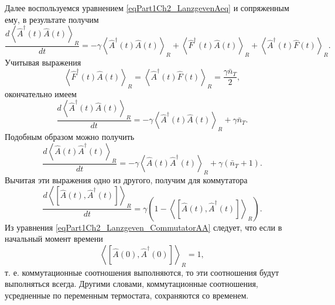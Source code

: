 Далее воспользуемся уравнением \eqref{eqPart1Ch2_LanzgevenAeq} и
сопряженным ему, в результате получим
\begin{equation}
\frac{d \left<\hat{A}^{\dag}\left(t\right)\hat{A}\left(t\right)\right>_R}{d
t}=
- \gamma \left<\hat{A}^{\dag}\left(t\right)\hat{A}\left(t\right)\right>_R
+ \left<\hat{F}^{\dag}\left(t\right)\hat{A}\left(t\right)\right>_R + 
\left<\hat{A}^{\dag}\left(t\right)\hat{F}\left(t\right)\right>_R.
\nonumber
\end{equation}
Учитывая выражения 
\begin{equation}
\left<\hat{F}^{\dag}\left(t\right)\hat{A}\left(t\right)\right>_R =
\left<\hat{A}^{\dag}\left(t\right)\hat{F}\left(t\right)\right>_R = 
\frac{\gamma \bar{n}_T}{2},
\nonumber
\end{equation}
окончательно имеем
\begin{equation}
\frac{d \left<\hat{A}^{\dag}\left(t\right)\hat{A}\left(t\right)\right>_R}{d
t}=
- \gamma \left<\hat{A}^{\dag}\left(t\right)\hat{A}\left(t\right)\right>_R
+ \gamma \bar{n}_T.
\nonumber
\end{equation}
Подобным образом можно получить
\begin{equation}
\frac{d \left<\hat{A}\left(t\right)\hat{A}^{\dag}\left(t\right)\right>_R}{d
t}=
- \gamma \left<\hat{A}\left(t\right)\hat{A}^{\dag}\left(t\right)\right>_R
+ \gamma \left(\bar{n}_T + 1\right).
\label{eqPart1Ch2_Lanzgeven_Task3}
\end{equation}
Вычитая эти выражения одно из другого, получим для коммутатора
\begin{equation}
\frac{d \left<\left[\hat{A}\left(t\right),\hat{A}^{\dag}\left(t\right)\right]\right>_R}{d
t}=
\gamma \left( 1 - \left<\left[\hat{A}\left(t\right),\hat{A}^{\dag}\left(t\right)\right]\right>_R
\right).
\label{eqPart1Ch2_Lanzgeven_CommutatorAA}
\end{equation}
Из уравнения \eqref{eqPart1Ch2_Lanzgeven_CommutatorAA} следует, что
если в начальный момент времени 
\[
\left<\left[\hat{A}\left(0\right),\hat{A}^{\dag}\left(0\right)\right]\right>_R
= 1,
\]
т. е. коммутационные соотношения выполняются, то эти соотношения будут
выполняться всегда. Другими словами, коммутационные соотношения,
усредненные по переменным термостата, сохраняются со временем. 

